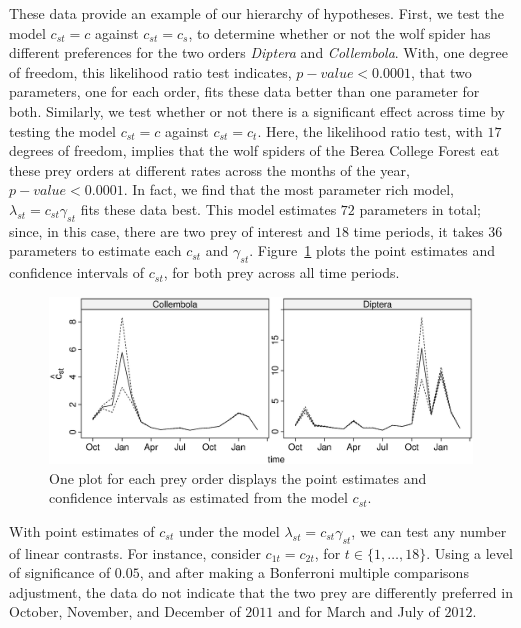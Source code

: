 These data provide an example of our hierarchy of hypotheses.  First, we test the model $c_{st} = c$ against $c_{st} = c_s$, to determine whether or not the wolf spider has different preferences for the two orders \textit{Diptera}  and \textit{Collembola}.  With, one degree of freedom, this likelihood ratio test indicates, $p-value < 0.0001$,  that two parameters, one for each order, fits these data better than one parameter for both.  Similarly, we test whether or not there is a significant effect across time by testing the model $c_{st} = c$ against $c_{st} = c_t$.  Here, the likelihood ratio test, with $17$ degrees of freedom, implies that the wolf spiders of the Berea College Forest eat these prey orders at different rates across the months of the year, $p-value < 0.0001$.  In fact, we find that the most parameter rich model, $\lambda_{st} = c_{st} \gamma_{st}$ fits these data best.  This model estimates $72$ parameters in total; since, in this case, there are two prey of interest and $18$ time periods, it takes $36$ parameters to estimate each $c_{st}$ and $\gamma_{st}$.  Figure~\ref{fig:cst} plots the point estimates and confidence intervals of $c_{st}$, for both prey across all time periods.  

\begin{figure}
  \centering
  \includegraphics[scale=0.5]{cst}
  \caption{One plot for each prey order displays the point estimates and confidence intervals as estimated from the model $c_{st}$.}
  \label{fig:cst}
\end{figure}

With point estimates of $c_{st}$ under the model $\lambda_{st} = c_{st} \gamma_{st}$, we can test any number of linear contrasts.  For instance, consider $c_{1t} = c_{2t}$, for $t \in \{1, \ldots, 18\}$.  Using a level of significance of $0.05$, and after making a Bonferroni multiple comparisons adjustment, the data do not indicate that the two prey are differently preferred in October, November, and December of $2011$ and for March and July of $2012$.  


